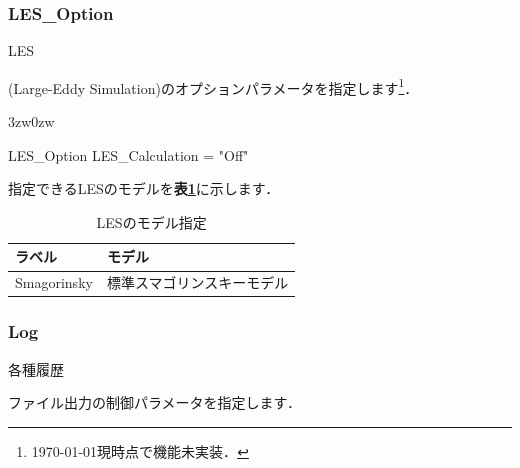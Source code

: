


\pagebreak
\subsubsection{LES\_Option}

\hypertarget{tgt:les_option}{LES}(Large-Eddy Simulation)のオプションパラメータを指定します\footnote{\today 現時点で機能未実装．}．

\begin{indentation}{3zw}{0zw}

{\small
\begin{program}
  LES_Option {
    LES_Calculation = "Off"
  }
\end{program}
}

指定できるLESのモデルを\textbf{表\ref{tbl:LES_model}}に示します．

\begin{table}[htdp]
\caption{LESのモデル指定}
\begin{center}
\small
\begin{tabular}{ll} \toprule
ラベル & モデル\\ \midrule
Smagorinsky & 標準スマゴリンスキーモデル\\ \bottomrule
\end{tabular}
\end{center}
\label{tbl:LES_model}
\end{table}

\end{indentation}



\pagebreak
\subsubsection{Log}

\hypertarget{tgt:log}{各種履歴}ファイル出力の制御パラメータを指定します．


